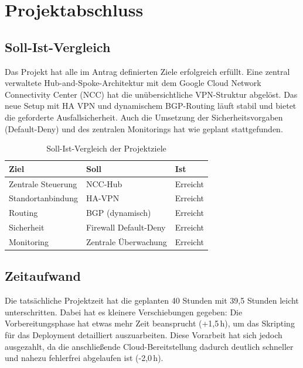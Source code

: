 \chapter{Projektabschluss}

\section{Soll-Ist-Vergleich}
Das Projekt hat alle im Antrag definierten Ziele erfolgreich erfüllt. Eine zentral verwaltete Hub-and-Spoke-Architektur mit dem Google Cloud Network Connectivity Center (NCC) hat die unübersichtliche VPN-Struktur abgelöst. Das neue Setup mit HA VPN und dynamischem BGP-Routing läuft stabil und bietet die geforderte Ausfallsicherheit. Auch die Umsetzung der Sicherheitsvorgaben (Default-Deny) und des zentralen Monitorings hat wie geplant stattgefunden.

\begin{table}[!ht]
\centering
\begin{tabularx}{\textwidth}{|X|X|X|}
\hline
\textbf{Ziel} & \textbf{Soll} & \textbf{Ist} \\ \hline
Zentrale Steuerung & NCC-Hub & Erreicht \\ \hline
Standortanbindung & HA-VPN & Erreicht \\ \hline
Routing & BGP (dynamisch) & Erreicht \\ \hline
Sicherheit & Firewall Default-Deny & Erreicht \\ \hline
Monitoring & Zentrale Überwachung & Erreicht \\ \hline
\end{tabularx}
\caption{Soll-Ist-Vergleich der Projektziele}
\end{table}

\section{Zeitaufwand}
Die tatsächliche Projektzeit hat die geplanten 40 Stunden mit 39,5 Stunden leicht unterschritten. Dabei hat es kleinere Verschiebungen gegeben: Die Vorbereitungsphase hat etwas mehr Zeit beansprucht (+1,5\,h), um das Skripting für das Deployment detailliert auszuarbeiten. Diese Vorarbeit hat sich jedoch ausgezahlt, da die anschließende Cloud-Bereitstellung dadurch deutlich schneller und nahezu fehlerfrei abgelaufen ist (-2,0\,h).

